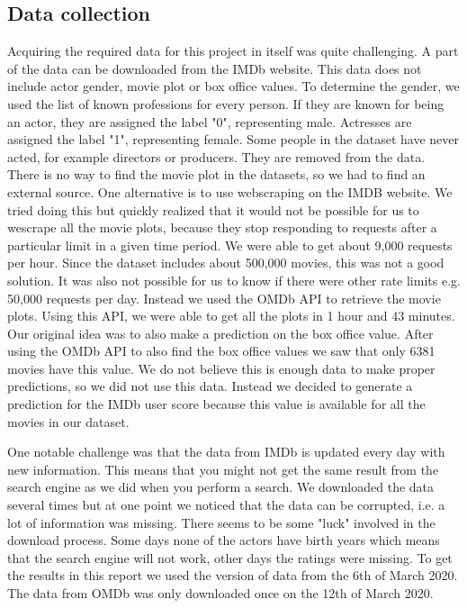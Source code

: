 
\subsection{Data collection}

Acquiring the required data for this project in itself was quite challenging. A part of the data can be downloaded from the IMDb website\cite{IMDbInterfaces}. This data does not include actor gender, movie plot or box office values. To determine the gender, we used the list of known professions for every person. If they are known for being an actor, they are assigned the label "0", representing male. Actresses are assigned the label "1", representing female. Some people in the dataset have never acted, for example directors or producers. They are removed from the data. There is no way to find the movie plot in the datasets, so we had to find an external source. One alternative is to use webscraping on the IMDB website. We tried doing this but quickly realized that it would not be possible for us to wescrape all the movie plots, because they stop responding to requests after a particular limit in a given time period. We were able to get about 9,000 requests per hour. Since the dataset includes about 500,000 movies, this was not a good solution. It was also not possible for us to know if there were other rate limits e.g. 50,000 requests per day. Instead we used the OMDb API\cite{OMDb} to retrieve the movie plots. Using this API, we were able to get all the plots in 1 hour and 43 minutes. Our original idea was to also make a prediction on the box office value. After using the OMDb API to also find the box office values we saw that only 6381 movies have this value. We do not believe this is enough data to make proper predictions, so we did not use this data. Instead we decided to generate a prediction for the IMDb user score because this value is available for all the movies in our dataset.

One notable challenge was that the data from IMDb is updated every day with new information. This means that you might not get the same result from the search engine as we did when you perform a search. We downloaded the data several times but at one point we noticed that the data can be corrupted, i.e. a lot of information was missing. There seems to be some "luck" involved in the download process. Some days none of the actors have birth years which means that the search engine will not work, other days the ratings were missing. To get the results in this report we used the version of data from the 6th of March 2020. The data from OMDb was only downloaded once on the 12th of March 2020.



